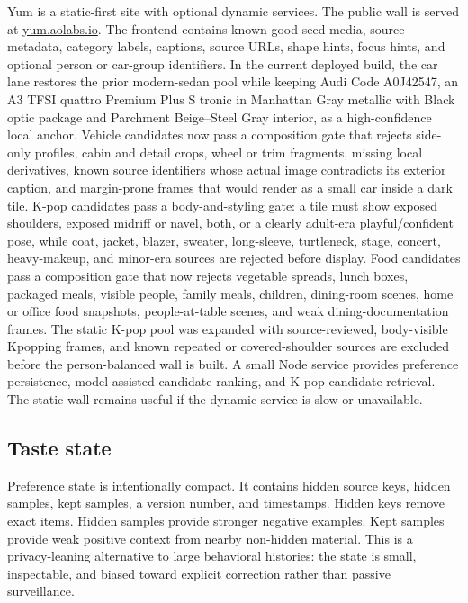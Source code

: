 \documentclass[12pt,letterpaper]{article}
\begin{document}
Yum is a static-first site with optional dynamic services. The public wall is served at \href{https://yum.aolabs.io}{yum.aolabs.io}. The frontend contains known-good seed media, source metadata, category labels, captions, source URLs, shape hints, focus hints, and optional person or car-group identifiers. In the current deployed build, the car lane restores the prior modern-sedan pool while keeping Audi Code A0J42547, an A3 TFSI quattro Premium Plus S tronic in Manhattan Gray metallic with Black optic package and Parchment Beige--Steel Gray interior, as a high-confidence local anchor. Vehicle candidates now pass a composition gate that rejects side-only profiles, cabin and detail crops, wheel or trim fragments, missing local derivatives, known source identifiers whose actual image contradicts its exterior caption, and margin-prone frames that would render as a small car inside a dark tile. K-pop candidates pass a body-and-styling gate: a tile must show exposed shoulders, exposed midriff or navel, both, or a clearly adult-era playful/confident pose, while coat, jacket, blazer, sweater, long-sleeve, turtleneck, stage, concert, heavy-makeup, and minor-era sources are rejected before display. Food candidates pass a composition gate that now rejects vegetable spreads, lunch boxes, packaged meals, visible people, family meals, children, dining-room scenes, home or office food snapshots, people-at-table scenes, and weak dining-documentation frames. The static K-pop pool was expanded with source-reviewed, body-visible Kpopping frames, and known repeated or covered-shoulder sources are excluded before the person-balanced wall is built. A small Node service provides preference persistence, model-assisted candidate ranking, and K-pop candidate retrieval. The static wall remains useful if the dynamic service is slow or unavailable.

\subsection{Taste state}

Preference state is intentionally compact. It contains hidden source keys, hidden samples, kept samples, a version number, and timestamps. Hidden keys remove exact items. Hidden samples provide stronger negative examples. Kept samples provide weak positive context from nearby non-hidden material. This is a privacy-leaning alternative to large behavioral histories: the state is small, inspectable, and biased toward explicit correction rather than passive surveillance.
\end{document}
